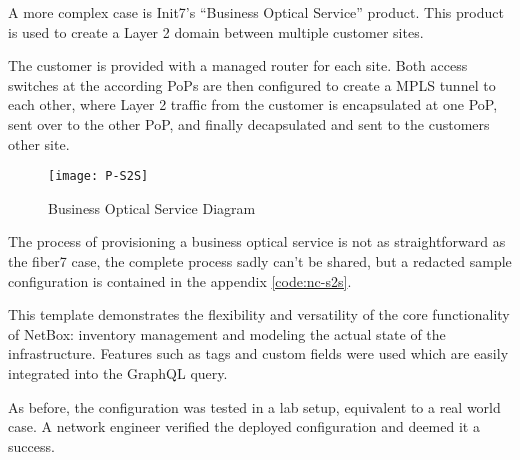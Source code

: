 A more complex case is Init7's ``Business Optical Service'' product. This product is used
to create a Layer 2 domain between multiple customer sites.

The customer is provided with a managed router for each site. Both access switches at the according
PoPs are then configured to create a MPLS tunnel to each other, where Layer 2 traffic from the customer
is encapsulated at one PoP, sent over to the other PoP, and finally decapsulated and sent to the customers
other site.

\begin{figure}[h]
  \centering
  \texttt{[image: P-S2S]}
  \caption{Business Optical Service Diagram}
  \label{fig:s2s}
\end{figure}

The process of provisioning a business optical service is not as straightforward as the fiber7 case,
the complete process sadly can't be shared, but a redacted sample configuration is contained in the
appendix \ref{code:nc-s2s}.

This template demonstrates the flexibility and versatility of the core functionality of NetBox: inventory management
and modeling the actual state of the infrastructure. Features such as tags and custom fields were used
which are easily integrated into the GraphQL query.

As before, the configuration was tested in a lab setup, equivalent to a real world case. A network engineer
verified the deployed configuration and deemed it a success.